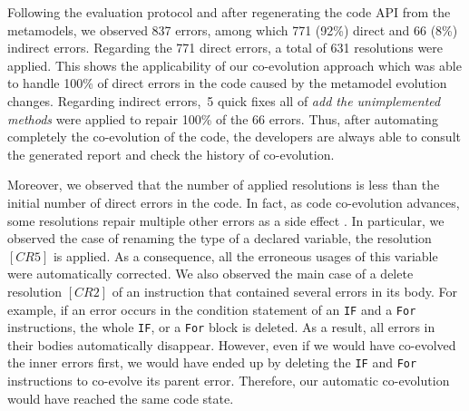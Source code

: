	Following the evaluation protocol and after regenerating the code API from the metamodels, we observed 837 errors, among which 771 (92\%) direct and 66 (8\%) indirect errors. 
	Regarding the 771 direct errors, 
	a total of 631 resolutions were applied.  
	This shows the applicability of our co-evolution approach which was able to handle 100\% of direct errors in the code caused by the metamodel evolution changes. Regarding indirect errors,~5 quick fixes all of \emph{add the unimplemented methods}  were applied to repair 100\% of the 66 errors.
	Thus, after automating completely the co-evolution of the code, the developers are always able to consult the generated report and check the history of co-evolution.

	
	Moreover, we observed that the number of applied resolutions is less than the initial number of direct errors in the code. In fact, as code co-evolution advances, some resolutions repair multiple other errors as a side effect \cite{cuadrado2018quick,khelladi2019detecting}. 
	In particular, we observed the case of renaming the type of a declared variable, the resolution $[CR5]$ is applied. As a consequence, all the erroneous usages of this variable were automatically corrected. We also observed the main case of a delete resolution $[CR2]$ of an instruction that contained several errors in its body.
	For example, if an error occurs in the condition statement of an \texttt{IF} and a \texttt{For} instructions, the whole \texttt{IF}, or a \texttt{For} block is deleted. As a result, all errors in their bodies automatically disappear. However, even if we would have co-evolved the inner errors first, we would have ended up by deleting the \texttt{IF} and \texttt{For} instructions to co-evolve its parent error. Therefore, our automatic co-evolution would have reached the same code state. 
	

